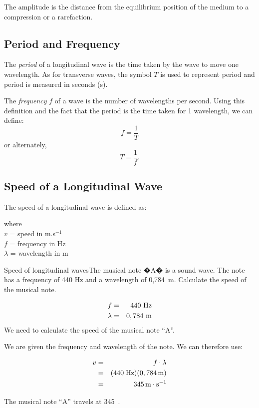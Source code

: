 The amplitude is the distance from the equilibrium position of the medium to a compression or a rarefaction.

\subsection{Period and Frequency}



The \emph{period} of a longitudinal wave is the time taken by the wave to move one wavelength. As for transverse waves, the symbol $T$ is used to represent period and period is measured in seconds (s).

The \textit{frequency} $f$ of a wave is the number of wavelengths per second. Using this definition and the fact that the period is the time taken for 1 wavelength, we can define:
\begin{equation*}
f=\frac{1}{T}
\end{equation*}
or alternately,
\begin{equation*}
T=\frac{1}{f}.
\end{equation*}

\subsection{Speed of a Longitudinal Wave}
The speed of a longitudinal wave is defined as:


where \\
$v$ = speed in m.s$^{-1}$\\
$f$ = frequency in Hz\\
$\lambda$ = wavelength in m

\begin{wex}
{Speed of longitudinal waves}{The musical note �A� is a sound wave. The note has a frequency of 440 Hz and a wavelength of 0,784~m. Calculate the speed of the musical note.}{
\begin{eqnarray*}
f &=& 440 \ \rm{Hz} \\
\lambda &=& 0,784\ \rm{m}
\end{eqnarray*}
We need to calculate the speed of the musical note ``A''.

We are given the frequency and wavelength of the note. We can therefore use:

\begin{eqnarray*}
v&=&f\cdot \lambda\\
&=&(440\;\rm{Hz})(0,784\,\rm{m})\\
&=&345\,\mathrm{m \cdot s^{-1}}
\end{eqnarray*}

The musical note ``A'' travels at 345~\ms.
}
\end{wex}

